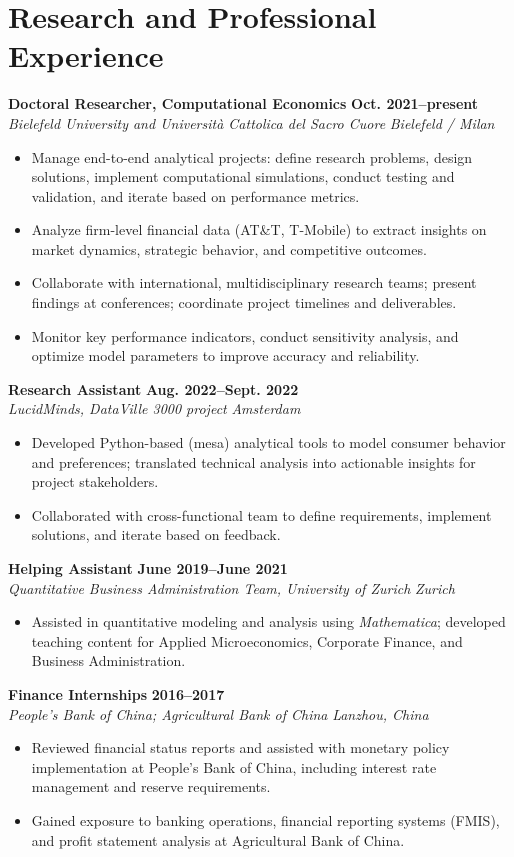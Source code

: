 \documentclass[a4paper,11pt]{article}
\newcommand{\role}[4]{%
  \textbf{#1} \hfill \textbf{#2}\\
  \textit{#3} \hfill \textit{#4}\par
}
\begin{document}
\section{Research and Professional Experience}
\role{Doctoral Researcher, Computational Economics}{Oct. 2021--present}{Bielefeld University and Universit\`a Cattolica del Sacro Cuore}{Bielefeld / Milan}
\begin{itemize}
  \item Manage end-to-end analytical projects: define research problems, design solutions, implement computational simulations, conduct testing and validation, and iterate based on performance metrics.
  \item Analyze firm-level financial data (AT\&T, T-Mobile) to extract insights on market dynamics, strategic behavior, and competitive outcomes.
  \item Collaborate with international, multidisciplinary research teams; present findings at conferences; coordinate project timelines and deliverables.
  \item Monitor key performance indicators, conduct sensitivity analysis, and optimize model parameters to improve accuracy and reliability.
\end{itemize}

\role{Research Assistant}{Aug. 2022--Sept. 2022}{LucidMinds, DataVille 3000 project}{Amsterdam}
\begin{itemize}
  \item Developed Python-based (mesa) analytical tools to model consumer behavior and preferences; translated technical analysis into actionable insights for project stakeholders.
  \item Collaborated with cross-functional team to define requirements, implement solutions, and iterate based on feedback.
\end{itemize}

\role{Helping Assistant}{June 2019--June 2021}{Quantitative Business Administration Team, University of Zurich}{Zurich}
\begin{itemize}
  \item Assisted in quantitative modeling and analysis using \textit{Mathematica}; developed teaching content for Applied Microeconomics, Corporate Finance, and Business Administration.
\end{itemize}

\role{Finance Internships}{2016--2017}{People's Bank of China; Agricultural Bank of China}{Lanzhou, China}
\begin{itemize}
  \item Reviewed financial status reports and assisted with monetary policy implementation at People's Bank of China, including interest rate management and reserve requirements.
  \item Gained exposure to banking operations, financial reporting systems (FMIS), and profit statement analysis at Agricultural Bank of China.
\end{itemize}
\end{document}
